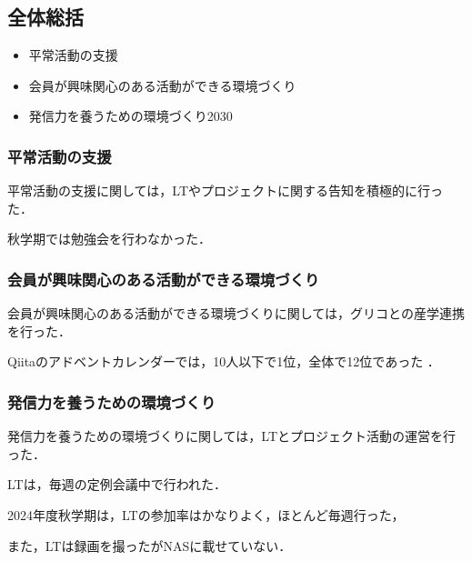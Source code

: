 \subsection*{全体総括}


\begin{itemize}
    \item 平常活動の支援
    \item 会員が興味関心のある活動ができる環境づくり
    \item 発信力を養うための環境づくり2030
\end{itemize}

\subsubsection*{平常活動の支援}
平常活動の支援に関しては，LTやプロジェクトに関する告知を積極的に行った．

秋学期では勉強会を行わなかった．　

\subsubsection*{会員が興味関心のある活動ができる環境づくり}
会員が興味関心のある活動ができる環境づくりに関しては，グリコとの産学連携を行った．

Qiitaのアドベントカレンダーでは，10人以下で1位，全体で12位であった  ．


\subsubsection*{発信力を養うための環境づくり}
発信力を養うための環境づくりに関しては，LTとプロジェクト活動の運営を行った．

LTは，毎週の定例会議中で行われた．

2024年度秋学期は，LTの参加率はかなりよく，ほとんど毎週行った，

また，LTは録画を撮ったがNASに載せていない．

